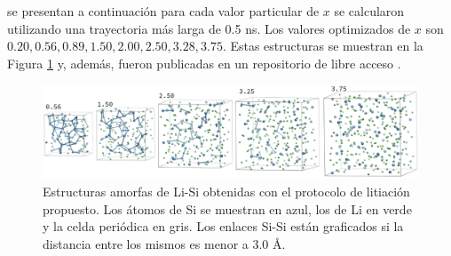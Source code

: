 se presentan a continuación para cada valor particular de $x$ se calcularon 
utilizando una trayectoria más larga de 0.5 ns. Los valores optimizados de $x$
son $0.20, 0.56, 0.89, 1.50, 2.00, 2.50, 3.28, 3.75$. Estas estructuras se 
muestran en la Figura \ref{fig:litiacion} y, además, fueron publicadas en un 
repositorio de libre acceso \cite{dftb_lisi_amorphous}.
\begin{figure}[h!]
    \centering
    \includegraphics[width=\textwidth]{Silicio/prediccion/metodos/litiacion.png}
    \caption{Estructuras amorfas de Li-Si obtenidas con el protocolo de litiación
    propuesto. Los átomos de Si se muestran en azul, los de Li en verde y la celda
    periódica en gris. Los enlaces Si-Si están graficados si la distancia entre 
    los mismos es menor a 3.0 \AA.}
    \label{fig:litiacion}
\end{figure}
